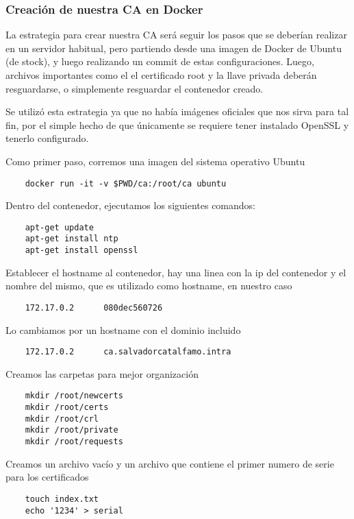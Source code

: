\subsubsection*{Creación de nuestra CA en Docker}

La estrategia para crear nuestra CA será seguir los pasos que se deberían realizar en un servidor 
habitual, pero partiendo desde una imagen de Docker de Ubuntu (de stock), y luego realizando un 
commit de estas configuraciones. Luego, archivos importantes como el el certificado root y la llave
privada deberán resguardarse, o simplemente resguardar el contenedor creado. 

Se utilizó esta estrategia ya que no había imágenes oficiales que nos sirva para tal fin, por el 
simple hecho de que únicamente se requiere tener instalado OpenSSL y tenerlo configurado.

\noindent Como primer paso, corremos una imagen del sistema operativo Ubuntu

\begin{verbatim}
    docker run -it -v $PWD/ca:/root/ca ubuntu
\end{verbatim}

\noindent Dentro del contenedor, ejecutamos los siguientes comandos:
\begin{verbatim}
    apt-get update
    apt-get install ntp
    apt-get install openssl
\end{verbatim}

\noindent Establecer el hostname al contenedor, hay una linea con la ip del contenedor y el nombre del mismo, 
que es utilizado como hostname, en nuestro caso
\begin{verbatim}
    172.17.0.2      080dec560726
\end{verbatim}

\noindent Lo cambiamos por un hostname con el dominio incluido
\begin{verbatim}
    172.17.0.2      ca.salvadorcatalfamo.intra
\end{verbatim}

\noindent Creamos las carpetas para mejor organización
\begin{verbatim}
    mkdir /root/newcerts
    mkdir /root/certs
    mkdir /root/crl
    mkdir /root/private
    mkdir /root/requests
\end{verbatim}

\noindent Creamos un archivo vacío y un archivo que contiene el primer numero de serie para los certificados 
\begin{verbatim}
    touch index.txt
    echo '1234' > serial
\end{verbatim}


